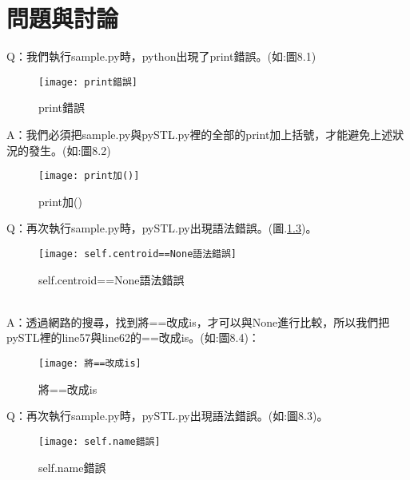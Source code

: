 \chapter{問題與討論}
\hspace{-1.7em} Q：我們執行sample.py時，python出現了print錯誤。(如:圖8.1)\\
\begin{figure}[hbt!]
\begin{center}
\texttt{[image: print錯誤]}
\caption{\Large print錯誤}
\label{print錯誤}
\end{center}
\end{figure}
\newpage
\hspace{-1.4em}A：我們必須把sample.py與pySTL.py裡的全部的print加上括號，才能避免上述狀況的發生。(如:圖8.2)\\

\begin{figure}[hbt!]
\begin{center}
\texttt{[image: print加()]}
\caption{\Large print加()}
\label{print加()}
\end{center}
\end{figure}

Q：再次執行sample.py時，pySTL.py出現語法錯誤。(圖.\ref{self.centroid==None語法錯誤})。\\
\begin{figure}[hbt!]
\begin{center}
\texttt{[image: self.centroid==None語法錯誤]}
\caption{\Large self.centroid==None語法錯誤}
\label{self.centroid==None語法錯誤}
\end{center}
\end{figure}
\qquad \\
A：透過網路的搜尋，找到將==改成is，才可以與None進行比較，所以我們把pySTL裡的line57與line62的==改成is。(如:圖8.4)：\\

\begin{figure}[hbt!]
\begin{center}
\texttt{[image: 將==改成is]}
\caption{\Large 將==改成is}
\label{將==改成is}
\end{center}
\end{figure}

Q：再次執行sample.py時，pySTL.py出現語法錯誤。(如:圖8.3)。\\
\begin{figure}[hbt!]
\begin{center}
\texttt{[image: self.name錯誤]}
\caption{\Large self.name錯誤}
\label{self.name錯誤}
\end{center}
\end{figure}
\qquad \\


